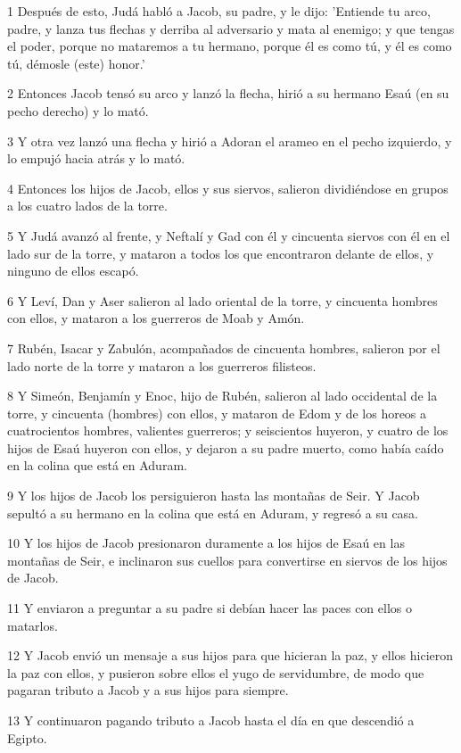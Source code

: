 \par 1 Después de esto, Judá habló a Jacob, su padre, y le dijo: 'Entiende tu arco, padre, y lanza tus flechas y derriba al adversario y mata al enemigo; y que tengas el poder, porque no mataremos a tu hermano, porque él es como tú, y él es como tú, démosle (este) honor.'
\par 2 Entonces Jacob tensó su arco y lanzó la flecha, hirió a su hermano Esaú (en su pecho derecho) y lo mató.
\par 3 Y otra vez lanzó una flecha y hirió a Adoran el arameo en el pecho izquierdo, y lo empujó hacia atrás y lo mató.
\par 4 Entonces los hijos de Jacob, ellos y sus siervos, salieron dividiéndose en grupos a los cuatro lados de la torre.
\par 5 Y Judá avanzó al frente, y Neftalí y Gad con él y cincuenta siervos con él en el lado sur de la torre, y mataron a todos los que encontraron delante de ellos, y ninguno de ellos escapó.
\par 6 Y Leví, Dan y Aser salieron al lado oriental de la torre, y cincuenta hombres con ellos, y mataron a los guerreros de Moab y Amón.
\par 7 Rubén, Isacar y Zabulón, acompañados de cincuenta hombres, salieron por el lado norte de la torre y mataron a los guerreros filisteos.
\par 8 Y Simeón, Benjamín y Enoc, hijo de Rubén, salieron al lado occidental de la torre, y cincuenta (hombres) con ellos, y mataron de Edom y de los horeos a cuatrocientos hombres, valientes guerreros; y seiscientos huyeron, y cuatro de los hijos de Esaú huyeron con ellos, y dejaron a su padre muerto, como había caído en la colina que está en Aduram.
\par 9 Y los hijos de Jacob los persiguieron hasta las montañas de Seir. Y Jacob sepultó a su hermano en la colina que está en Aduram, y regresó a su casa.
\par 10 Y los hijos de Jacob presionaron duramente a los hijos de Esaú en las montañas de Seir, e inclinaron sus cuellos para convertirse en siervos de los hijos de Jacob.
\par 11 Y enviaron a preguntar a su padre si debían hacer las paces con ellos o matarlos.
\par 12 Y Jacob envió un mensaje a sus hijos para que hicieran la paz, y ellos hicieron la paz con ellos, y pusieron sobre ellos el yugo de servidumbre, de modo que pagaran tributo a Jacob y a sus hijos para siempre.
\par 13 Y continuaron pagando tributo a Jacob hasta el día en que descendió a Egipto.
